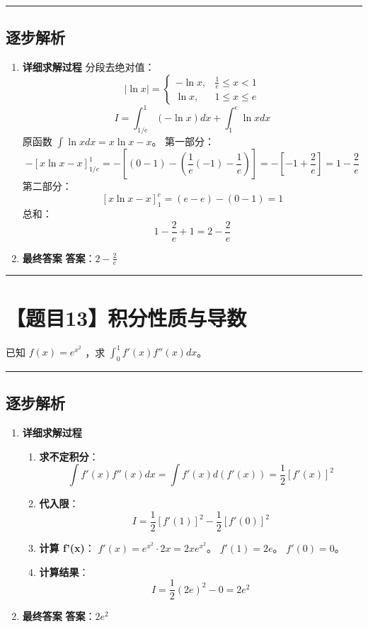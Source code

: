\documentclass[UTF8]{ctexart}
\newenvironment{redenv}{\color{red}}{}
\newenvironment{detailedanalysis}{%
    \color{red}
    \begin{enumerate}[label=\textbf{第\arabic*步：}, leftmargin=*, align=left, itemsep=1.5ex]
}{%
    \end{enumerate}
}
\newcommand{\problemrule}{\noindent\rule{\textwidth}{1.5pt}\vspace{-0.8em}}
\newcommand{\analysisrule}{\noindent\rule{\textwidth}{0.8pt}\vspace{-0.8em}}
\begin{document}
\begin{redenv}
\analysisrule
\subsection*{逐步解析}

\begin{detailedanalysis}
\item \textbf{详细求解过程}
分段去绝对值：
$$ |\ln x| = \begin{cases} -\ln x, & \frac{1}{e} \le x < 1 \\ \ln x, & 1 \le x \le e \end{cases} $$
$$ I = \int_{1/e}^1 (-\ln x) dx + \int_1^e \ln x dx $$
原函数 $\int \ln x dx = x\ln x - x$。
第一部分：
$$ -[x\ln x - x]_{1/e}^1 = -[(0 - 1) - (\frac{1}{e}(-1) - \frac{1}{e})] = -[-1 + \frac{2}{e}] = 1 - \frac{2}{e} $$
第二部分：
$$ [x\ln x - x]_1^e = (e - e) - (0 - 1) = 1 $$
总和：
$$ 1 - \frac{2}{e} + 1 = 2 - \frac{2}{e} $$

\item \textbf{最终答案}
\textbf{答案}：$ 2 - \frac{2}{e} $
\end{detailedanalysis}
\end{redenv}

\problemrule
\section*{【题目13】积分性质与导数}
已知 $ f(x) = e^{x^{2}} $ ，求 $ \int_{0}^{1} f'(x) f''(x) dx $。

\begin{redenv}
\analysisrule
\subsection*{逐步解析}

\begin{detailedanalysis}
\item \textbf{详细求解过程}
\begin{enumerate}[label=(\arabic*)]
\item \textbf{求不定积分}：
$$ \int f'(x) f''(x) dx = \int f'(x) d(f'(x)) = \frac{1}{2} [f'(x)]^2 $$
\item \textbf{代入限}：
$$ I = \frac{1}{2} [f'(1)]^2 - \frac{1}{2} [f'(0)]^2 $$
\item \textbf{计算 f'(x)}：
$f'(x) = e^{x^2} \cdot 2x = 2xe^{x^2}$。
$f'(1) = 2e$。
$f'(0) = 0$。
\item \textbf{计算结果}：
$$ I = \frac{1}{2} (2e)^2 - 0 = 2e^2 $$
\end{enumerate}

\item \textbf{最终答案}
\textbf{答案}：$ 2e^2 $
\end{detailedanalysis}
\end{redenv}
\end{document}
